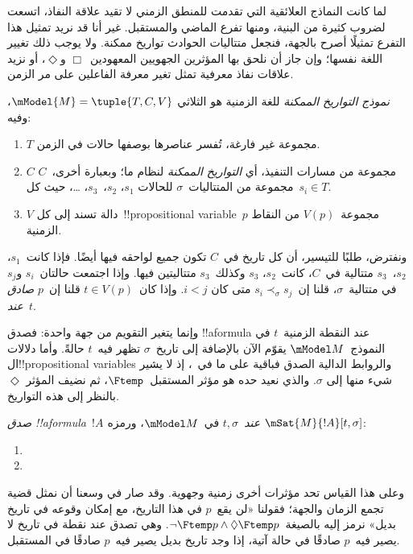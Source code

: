 \documentclass[../../../include/open-logic-section]{subfiles}
\begin{document}


لما كانت النماذج العلائقية التي تقدمت للمنطق الزمني لا تقيد علاقة النفاذ،
اتسعت لضروب كثيرة من البنية، ومنها تفرع الماضي والمستقبل. غير أنا قد نريد
تمثيل هذا التفرع تمثيلًا أصرح بالجهة، فنجعل متتاليات الحوادث تواريخ ممكنة.
ولا يوجب ذلك تغيير اللغة نفسها؛ وإن جاز أن نلحق بها المؤثرين الجهويين
المعهودين~$\Box$ و$\Diamond$، أو نزيد علاقات نفاذ معرفية تمثل تغير معرفة
الفاعلين على مر الزمن.

\begin{defn}
  \emph{نموذج التواريخ الممكنة} للغة الزمنية هو الثلاثي
  $\mModel{M}=\tuple{T,C,V}$، وفيه:
  \begin{enumerate}
    \item $T$ مجموعة غير فارغة، تُفسر عناصرها بوصفها حالات في الزمن.
    \item $C$ مجموعة من مسارات التنفيذ، أي \emph{التواريخ الممكنة}
      لنظام ما؛ وبعبارة أخرى،~$C$ مجموعة من المتتاليات~$\sigma$ للحالات
      $s_1$، $s_2$،~$s_3$، \dots، حيث كل~$s_i \in T$.
    \item $V$ دالة تسند إلى كل~!!{propositional
      variable}~$p$ مجموعة~$V(p)$ من النقاط الزمنية.
  \end{enumerate}
  ونفترض، طلبًا للتيسير، أن كل تاريخ في~$C$ تكون جميع لواحقه فيها أيضًا.
  فإذا كانت~$s_1$، $s_2$،~$s_3$ متتالية في~$C$، كانت~$s_2$، $s_3$
  وكذلك~$s_3$ متتاليتين فيها. وإذا اجتمعت حالتان~$s_i$ و$s_j$ في
  متتالية~$\sigma$، قلنا إن~$s_i \prec_\sigma s_j$ متى كان $i<j$.
  وإذا كان~$t \in V(p)$ قلنا إن~$p$ \emph{صادق عند}~$t$.
\end{defn}

وإنما يتغير التقويم من جهة واحدة: فصدق !!a{formula} عند النقطة الزمنية~$t$
في النموذج~$\mModel M$ يقوّم الآن بالإضافة إلى تاريخ~$\sigma$ تظهر فيه~$t$
حالةً. وأما دلالات ال!!{propositional variable}s والروابط الدالية الصدق
فباقية على ما في~، إذ لا يشير شيء منها إلى
$\sigma$. والذي نعيد حده هو مؤثر المستقبل~$\Ftemp$، ثم نضيف المؤثر
$\Diamond$ بالنظر إلى هذه التواريخ.

\begin{defn}
  \emph{صدق !!a{formula}~$!A$ عند~$t,\sigma$} في~$\mModel M$، ورمزه
  $\mSat{M}{!A}[t,\sigma]$:
  \begin{enumerate}
  \item{} 
  \item{} 
  \end{enumerate}
\end{defn}

وعلى هذا القياس تحد مؤثرات أخرى زمنية وجهوية. وقد صار في وسعنا أن نمثل
قضية تجمع الزمان والجهة؛ فقولنا «لن يقع~$p$ في هذا التاريخ، مع إمكان وقوعه
في تاريخ بديل» نرمز إليه بالصيغة~$\lnot \Ftemp p \land \Diamond \Ftemp p$. وهي تصدق عند
نقطة في تاريخ لا يصير فيه~$p$ صادقًا في حالة آتية، إذا وجد تاريخ بديل
يصير فيه~$p$ صادقًا في المستقبل.
\end{document}
